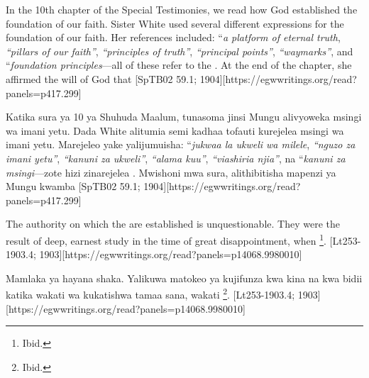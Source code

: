  \label{chap:authority}


 \label{chap:authority}


In the 10th chapter of the Special Testimonies, we read how God established the foundation of our faith. Sister White used several different expressions for the foundation of our faith. Her references included: “\textit{a platform of eternal truth}, \textit{“pillars of our faith”}, \textit{“principles of truth”}, \textit{“principal points”}, \textit{“waymarks”}, and “\textit{foundation principles}—all of these refer to the . At the end of the chapter, she affirmed the will of God that [SpTB02 59.1; 1904][https://egwwritings.org/read?panels=p417.299]


Katika sura ya 10 ya Shuhuda Maalum, tunasoma jinsi Mungu alivyoweka msingi wa imani yetu. Dada White alitumia semi kadhaa tofauti kurejelea msingi wa imani yetu. Marejeleo yake yalijumuisha: “\textit{jukwaa la ukweli wa milele}, \textit{“nguzo za imani yetu”}, \textit{“kanuni za ukweli”}, \textit{“alama kuu”}, \textit{“viashiria njia”}, na “\textit{kanuni za msingi}—zote hizi zinarejelea . Mwishoni mwa sura, alithibitisha mapenzi ya Mungu kwamba [SpTB02 59.1; 1904][https://egwwritings.org/read?panels=p417.299]


The authority on which the  are established is unquestionable. They were the result of deep, earnest study in the time of great disappointment, when \footnote{Ibid.}. [Lt253-1903.4; 1903][https://egwwritings.org/read?panels=p14068.9980010]


Mamlaka ya  hayana shaka. Yalikuwa matokeo ya kujifunza kwa kina na kwa bidii katika wakati wa kukatishwa tamaa sana, wakati \footnote{Ibid.}. [Lt253-1903.4; 1903][https://egwwritings.org/read?panels=p14068.9980010]


